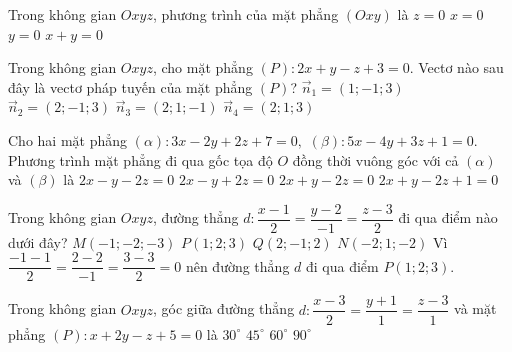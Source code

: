\begin{ex}%
Trong không gian $Oxyz$, phương trình của mặt phẳng $(Oxy)$ là
\choice
{\True $z=0$}
{$x=0$}
{$y=0$}
{$x+y=0$}
\end{ex}

\begin{ex}%
Trong không gian $Oxyz$, cho mặt phẳng $(P)\colon 2x+y-z+3=0$. Vectơ nào sau đây là vectơ pháp tuyến của mặt phẳng $(P)$?
\choice
{$\overrightarrow{n}_1=(1;-1;3)$}
{$\overrightarrow{n}_2=(2;-1;3)$}
{\True $\overrightarrow{n}_3=(2;1;-1)$}
{ $\overrightarrow{n}_4=(2;1;3)$}
\end{ex}

\begin{ex}%
Cho hai mặt phẳng $(\alpha)\colon  3 x-2 y+2 z+7=0,$ $(\beta)\colon 5 x-4 y+3 z+1=0$. Phương trình mặt phẳng đi qua gốc tọa độ $O$ đồng thời vuông góc với cả $(\alpha)$ và $(\beta)$ là
\choice
{$2 x-y-2 z=0$}
{$2 x-y+2 z=0$}
{\True $2 x+y-2 z=0$}
{$2 x+y-2 z+1=0$}
\end{ex}

\begin{ex}%
Trong không gian $Oxyz$, đường thẳng $d\colon \dfrac{x-1}{2}=\dfrac{y-2}{-1}=\dfrac{z-3}{2}$ đi qua điểm nào dưới đây?
\choice
{$M(-1;-2;-3)$}
{\True $P(1;2;3)$}
{$Q(2;-1;2)$}
{$N(-2;1;-2)$}
\loigiai
{
Vì $\dfrac{-1-1}{2}=\dfrac{2-2}{-1}=\dfrac{3-3}{2}=0$ nên đường thẳng $d$ đi qua điểm $P(1;2;3)$.
}
\end{ex}

\begin{ex}%
Trong không gian $Oxyz$, góc giữa đường thẳng $d:\dfrac{x-3}{2}=\dfrac{y+1}{1}=\dfrac{z-3}{1}$ và mặt phẳng  $(P):x+2y-z+5=0$ là
\choice
{\True $30^{\circ}$}
{ $45^{\circ}$}
{$60^{\circ}$}
{$90^{\circ}$}
\end{ex}

